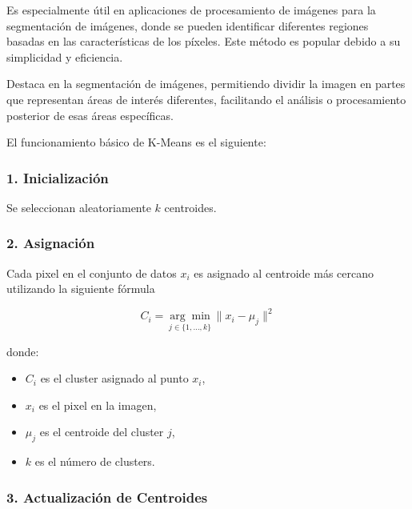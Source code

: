 Es especialmente útil en aplicaciones de procesamiento de imágenes para la segmentación de imágenes, donde se pueden identificar diferentes regiones basadas en las características de los píxeles. Este método es popular debido a su simplicidad y eficiencia.

Destaca en la segmentación de imágenes, permitiendo dividir la imagen en partes que representan áreas de interés diferentes, facilitando el análisis o procesamiento posterior de esas áreas específicas.

El funcionamiento básico de K-Means es el siguiente:

\subsubsection{1. Inicialización}

Se seleccionan aleatoriamente $k$ centroides.

\subsubsection{2. Asignación}

Cada pixel en el conjunto de datos $x_i$ es asignado al centroide más cercano utilizando la siguiente fórmula

$$C_i =\underset{j\in \lbrace 1,\ldots,k\rbrace }{\arg \min } \|x_i -\mu_j {\|}^2$$

donde:

\begin{itemize}
\setlength{\itemsep}{-1ex}
   \item{\begin{flushleft} $C_i$ es el cluster asignado al punto $x_i$, \end{flushleft}}
   \item{\begin{flushleft} $x_i$ es el pixel en la imagen, \end{flushleft}}
   \item{\begin{flushleft} $\mu_j$ es el centroide del cluster $j$, \end{flushleft}}
   \item{\begin{flushleft} $k$ es el número de clusters. \end{flushleft}}
\end{itemize}

\subsubsection{3. Actualización de Centroides}

